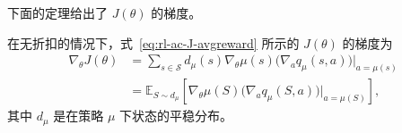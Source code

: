 下面的定理给出了 $J(\theta)$ 的梯度。

\begin{theorem}[无折扣的情况下的确定性策略梯度定理（定理 10.4）]\label{thm:rl-ac-dpg-undiscounted}
在无折扣的情况下，式~\eqref{eq:rl-ac-J-avgreward} 所示的 $J(\theta)$ 的梯度为
\begin{equation}
\begin{aligned}
\nabla_{\theta} J(\theta) &= \sum_{s \in \mathcal{S}} d_{\mu}(s) \nabla_{\theta} \mu(s) \big( \nabla_{a} q_{\mu}(s, a) \big) |_{a = \mu(s)} \\
&= \mathbb{E}_{S \sim d_{\mu}} \left[ \nabla_{\theta} \mu(S) \big( \nabla_{a} q_{\mu}(S, a) \big) |_{a = \mu(S)} \right],
\end{aligned}
\label{eq:rl-ac-dpg-undiscounted}
\end{equation}
其中 $d_{\mu}$ 是在策略 $\mu$ 下状态的平稳分布。
\end{theorem}

